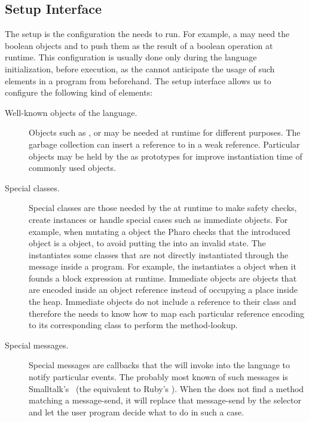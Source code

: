 \subsection{\VM Setup Interface}

The \VM setup is the configuration the \VM needs to run.
For example, a \VM may need the boolean objects  and  to push them as the result of a boolean operation at runtime.
This configuration is usually done only during the language initialization, before execution, as the \VM cannot anticipate the usage of such elements in a program from beforehand.
The \VM setup interface allows us to configure the following kind of elements:

\begin{description}
\item[Well-known objects of the language.] Objects such as ,  or  may be needed at runtime for different purposes. The garbage collection can insert a reference to  in a weak reference. Particular objects may be held by the \VM as prototypes for improve instantiation time of commonly used objects.
\item[Special classes.] Special classes are those needed by the \VM at runtime to make safety checks, create instances or handle special cases such as immediate objects. For example, when mutating a  object the Pharo \VM checks that the introduced object is a  object, to avoid putting the  into an invalid state. The \VM instantiates some classes that are not directly instantiated through the  message inside a program. For example, the \VM instantiates a  object when it founds a block expression at runtime. Immediate objects are objects that are encoded inside an object reference instead of occupying a place inside the heap. Immediate objects do not include a reference to their class and therefore the \VM needs to know how to map each particular reference encoding to its corresponding class to perform the method-lookup. 
\item[Special messages.] Special messages are callbacks that the \VM will invoke into the language to notify particular events. The probably most known of such messages is Smalltalk's ~(the equivalent to Ruby's ). When the \VM does not find a method matching a message-send, it will replace that message-send by the  selector and let the user program decide what to do in such a case.
\end{description}

